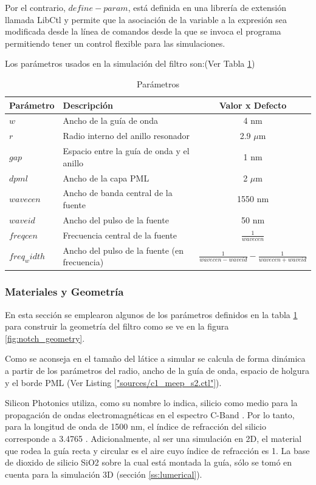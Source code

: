 Por el contrario, $define-param$, está definida en una librería de extensión llamada LibCtl y permite que la 
asociación de la variable a la expresión sea modificada desde la línea de comandos desde la que se invoca el 
programa permitiendo tener un control flexible para las simulaciones. 

Los parámetros usados en la simulación del filtro son:(Ver Tabla \ref{tb:meep_params})

\begin{table}
\centering
\begin{tabular}{| l | l | c | }
\hline
Parámetro & Descripción & Valor x Defecto \\
\hline
$w$ &	Ancho de la guía de onda &  4 nm \\
$r$ &	Radio interno del anillo resonador &	2.9 $\mu$m \\
$gap$ &	Espacio entre la guía de onda y el anillo & 1 nm \\
$dpml$ &    Ancho de la capa PML &  2  $\mu$m \\
$wavecen$ & Ancho de banda central de la fuente &   1550 nm \\
$waveid$ &  Ancho del pulso de la fuente &  50 nm \\
$freqcen$ & Frecuencia central de la fuente &	$\frac{1}{wavecen}$ \\
$freq_width$ &	Ancho del pulso de la fuente (en frecuencia) &	$\frac{1}{wavecen-waveid} - \frac{1}{wavecen+waveid}$ \\
\hline
\end{tabular}
\caption{Parámetros}
\label{tb:meep_params}
\end{table}


\subsubsection{Materiales y Geometría}

En esta sección se emplearon algunos de los parámetros definidos en
la tabla \ref{tb:meep_params} para construir la geometría del filtro como se ve en
la figura \ref{fig:notch_geometry}.

Como se aconseja en \cite{MassachusettsInstituteofTechnology} 
el tamaño del látice a simular se calcula 
de forma dinámica a partir de los parámetros del radio, ancho de la guía de onda, 
espacio de holgura y el borde PML (Ver Listing \ref{"sources/c1_meep_s2.ctl"}). 

Silicon Photonics utiliza, como su nombre lo indica, silicio como medio para la propagación de ondas electromagnéticas en el espectro C-Band . 
Por lo tanto, para la longitud de onda de 1500 nm, el índice de refracción del silicio corresponde a 3.4765 \cite{bass2009handbook}. 
Adicionalmente, al ser una simulación en 2D, el material que rodea la guía recta y circular es el aire cuyo índice de refracción es 1. 
La base de dioxido de silicio SiO2 sobre la cual está montada la guía, sólo se tomó en cuenta para la simulación 3D (sección \ref{ss:lumerical}).

